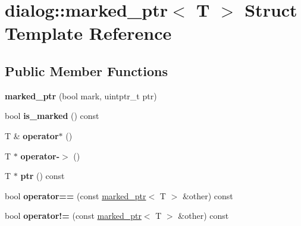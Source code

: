 \hypertarget{structdialog_1_1marked__ptr}{}\section{dialog\+:\+:marked\+\_\+ptr$<$ T $>$ Struct Template Reference}
\label{structdialog_1_1marked__ptr}
\subsection*{Public Member Functions}
\begin{DoxyCompactItemize}
\item 
\mbox{\label{structdialog_1_1marked__ptr_a0c5cb3ea7df17617e8eb36125caad9a2}} 
{\bfseries marked\+\_\+ptr} (bool mark, uintptr\+\_\+t ptr)
\item 
\mbox{\label{structdialog_1_1marked__ptr_a3a8c6534187e6aaf26eb1ae14e7ceeea}} 
bool {\bfseries is\+\_\+marked} () const
\item 
\mbox{\label{structdialog_1_1marked__ptr_ae2805da3106dbb27901736c92c1e4731}} 
T \& {\bfseries operator$\ast$} ()
\item 
\mbox{\label{structdialog_1_1marked__ptr_aa34bbb2dc822861452b9bc91dbec7830}} 
T $\ast$ {\bfseries operator-\/$>$} ()
\item 
\mbox{\label{structdialog_1_1marked__ptr_ac09bcb689595c6bc3f3dda12e8b591e7}} 
T $\ast$ {\bfseries ptr} () const
\item 
\mbox{\label{structdialog_1_1marked__ptr_ad8010102e1d52322c4991b6425b59bf2}} 
bool {\bfseries operator==} (const \hyperlink{structdialog_1_1marked__ptr}{marked\+\_\+ptr}$<$ T $>$ \&other) const
\item 
\mbox{\label{structdialog_1_1marked__ptr_a6c2089f165d66213f936a05adf417874}} 
bool {\bfseries operator!=} (const \hyperlink{structdialog_1_1marked__ptr}{marked\+\_\+ptr}$<$ T $>$ \&other) const
\item 
\mbox{\label{structdialog_1_1marked__ptr_adc31b51e967006e2c856bb2f13eff68c}} 

\end{DoxyCompactItemize}
